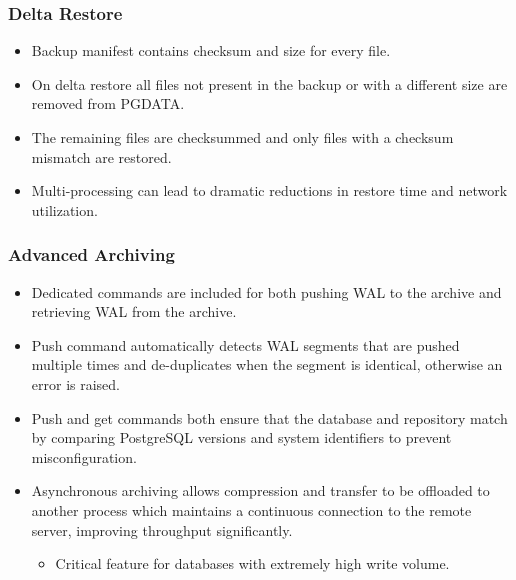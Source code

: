 \begin{frame}
    \frametitle{Delta Restore}

    \begin{itemize}
        \item Backup manifest contains checksum and size for every file.\pause
        \item On delta restore all files not present in the backup or with a different size are removed from PGDATA.\pause
        \item The remaining files are checksummed and only files with a checksum mismatch are restored.\pause
        \item Multi-processing can lead to dramatic reductions in restore time and network utilization.
    \end{itemize}
\end{frame}

\begin{frame}
    \frametitle{Advanced Archiving}

    \begin{itemize}
        \item Dedicated commands are included for both pushing WAL to the archive and retrieving WAL from the archive.\pause
        \item Push command automatically detects WAL segments that are pushed multiple times and de-duplicates when the segment is identical, otherwise an error is raised.\pause
        \item Push and get commands both ensure that the database and repository match by comparing PostgreSQL versions and system identifiers to prevent misconfiguration.\pause

        \item Asynchronous archiving allows compression and transfer to be offloaded to another process which maintains a continuous connection to the remote server, improving throughput significantly.\pause

            \begin{itemize}
                \item Critical feature for databases with extremely high write volume.
            \end{itemize}
    \end{itemize}
\end{frame}

